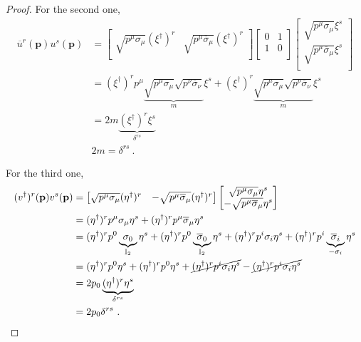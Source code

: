 \begin{proof}
        For the second one, 
        \begin{equation*}
        \begin{aligned}
            \overline u^r (\mathbf p) u^s (\mathbf p) & = \begin{bmatrix}
                \sqrt{p^\mu \sigma_\mu} (\xi^\dagger)^r & \sqrt{p^\mu \overline \sigma_\mu} (\xi^\dagger)^r \\
            \end{bmatrix} \begin{bmatrix}
                0 & 1 \\ 1 & 0 \\
            \end{bmatrix} \begin{bmatrix}
                \sqrt{p^\mu \sigma_\mu} \xi^s \\ \sqrt{p^\mu \overline \sigma_\mu} \xi^s \\
            \end{bmatrix} \\ & = (\xi^\dagger)^r p^\mu \underbrace{\sqrt{p^\mu  \sigma_\mu} \sqrt{p^\nu \overline \sigma_\nu}}_m \xi^s + (\xi^\dagger)^r \underbrace{\sqrt{p^\mu \sigma_\mu} \sqrt{p^\nu \overline \sigma_\nu}}_m \xi^s \\ & = 2 m \underbrace{(\xi^\dagger)^r \xi^s}_{\delta^{rs}} \\ & 2 m = \delta^{rs} ~.
        \end{aligned}
        \end{equation*}

        For the third one, 
        \begin{equation*}
        \begin{aligned}
            (v^\dagger)^r (\mathbf p) v^s (\mathbf p) & = \begin{bmatrix}
                \sqrt{p^\mu \sigma_\mu} (\eta^\dagger)^r & - \sqrt{p^\mu \overline \sigma_\mu} (\eta^\dagger)^r \\
            \end{bmatrix} \begin{bmatrix}
                \sqrt{p^\mu \sigma_\mu} \eta^s \\ - \sqrt{p^\mu \overline \sigma_\mu} \eta^s \\
            \end{bmatrix} \\ & = (\eta^\dagger)^r p^\mu \sigma_\mu \eta^s + (\eta^\dagger)^r p^\mu \overline \sigma_\mu \eta^s \\ & = (\eta^\dagger)^r p^0 \underbrace{\sigma_0}_{\mathbb I_2} \eta^s + (\eta^\dagger)^r p^0 \underbrace{\overline \sigma_0}_{\mathbb I_2} \eta^s + (\eta^\dagger)^r p^i \sigma_i \eta^s + (\eta^\dagger)^r p^i \underbrace{\overline \sigma_i}_{- \sigma_i} \eta^s \\ & = (\eta^\dagger)^r p^0 \eta^s + (\eta^\dagger)^r p^0 \eta^s + \cancel{(\eta^\dagger)^r p^i \sigma_i \eta^s } - \cancel{(\eta^\dagger)^r p^i \sigma_i \eta^s} \\ & = 2 p_0 \underbrace{(\eta^\dagger)^r \eta^s}_{\delta^{rs}} \\ & = 2 p_0 \delta^{rs} ~.
        \end{aligned}
        \end{equation*}


\end{proof}
